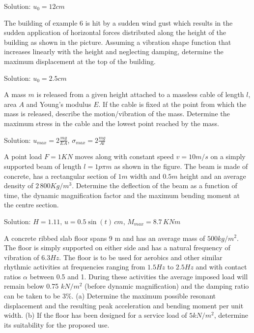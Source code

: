 \documentclass{problems}
\begin{document}
\begin{center}
\end{center}

Solution: $u_0 = 12cm$



 The building of example 6 is hit by a sudden wind gust which results in the sudden application of horizontal forces distributed along the height of the building as shown in the picture. Assuming a vibration shape function that increases linearly with the height and neglecting damping, determine the maximum displacement at the top of the building.

\begin{center}
\end{center}

Solution: $u_0 = 2.5cm$



 A mass $m$ is released from a given height attached to a massless cable of length $l$, area $A$ and Young's modulus $E$. If the cable is fixed at the point from which the mass is released, describe the motion/vibration of the mass. Determine the maximum stress in the cable and the lowest point reached by the mass.

\begin{center}
\end{center}

Solution: $u_{max} = 2\frac{mg}{EA}$, $\sigma_{max} = 2\frac{mg}{Al}$



 A point load $F=1KN$ moves along with constant speed $v=10m/s$ on a simply supported beam of length $l=1p\pi m$ as shown in the figure. The beam is made of concrete, has a rectangular section of $1m$ width and $0.5m$ height and an average density of $2\,800Kg/m^3$. Determine the deflection of the beam as a function of time, the dynamic magnification factor and the maximum bending moment at the centre section.

\begin{center}
\end{center}

Solution: $H=1.11$, $u=0.5\sin(t)\,cm$, $M_{max} = 8.7\,KNm$


 A concrete ribbed slab floor spans 9 m and has an average mass of $500 kg/m^2$. The floor is simply supported on either side and has a natural frequency of vibration of $6.3 Hz$. The floor is to be used for aerobics and other similar rhythmic activities at frequencies ranging from $1.5 Hz$ to $2.5 Hz$ and with contact ratios $\alpha$ between 0.5 and 1. During these activities the average imposed load will remain below 0.75 $kN/m^2$ (before dynamic magnification) and the damping ratio can be taken to be $3\%$. (a) Determine the maximum possible resonant displacement and the resulting peak acceleration and bending moment per unit width. (b) If the floor has been designed for a service load of $5kN/m^2$, determine its suitability for the proposed use.
\end{document}
